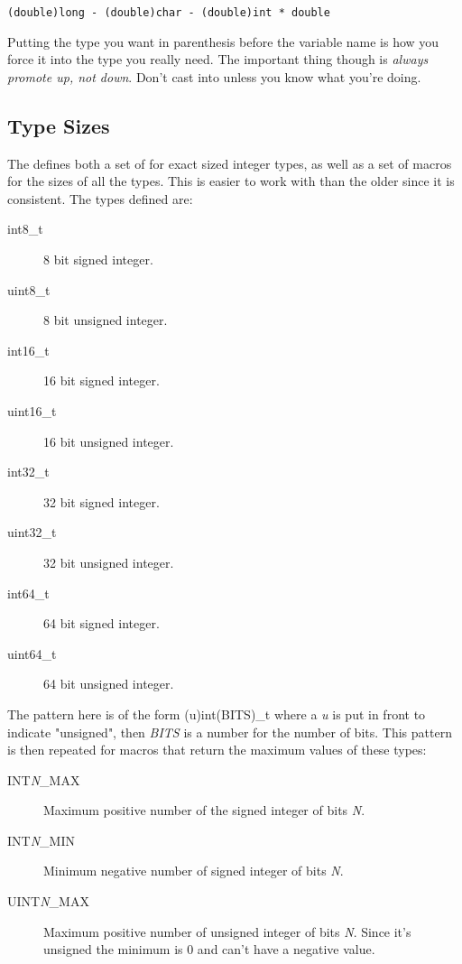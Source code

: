 \verb|(double)long - (double)char - (double)int * double|

Putting the type you want in parenthesis before the variable name is how you
force it into the type you really need.  The important thing though is 
\emph{always promote up, not down}.  Don't cast  into 
unless you know what you're doing.

\subsection{Type Sizes}

The  defines both a set of  for exact sized integer
types, as well as a set of macros for the sizes of all the types.  This is easier
to work with than the older  since it is consistent.  The types
defined are:

\begin{description}
\item[int8\_t] 8 bit signed integer.
\item[uint8\_t] 8 bit unsigned integer.
\item[int16\_t] 16 bit signed integer.
\item[uint16\_t] 16 bit unsigned integer.
\item[int32\_t] 32 bit signed integer.
\item[uint32\_t] 32 bit unsigned integer.
\item[int64\_t] 64 bit signed integer.
\item[uint64\_t] 64 bit unsigned integer.
\end{description}

The pattern here is of the form (u)int(BITS)\_t where a \emph{u} is put in front to indicate
"unsigned", then \emph{BITS} is a number for the number of bits.  This pattern is then repeated
for macros that return the maximum values of these types:

\begin{description}
\item[INT\emph{N}\_MAX] Maximum positive number of the signed integer of bits \emph{N}.
\item[INT\emph{N}\_MIN] Minimum negative number of signed integer of bits \emph{N}.
\item[UINT\emph{N}\_MAX] Maximum positive number of unsigned integer of bits \emph{N}. Since it's unsigned the minimum is 0 and can't have a negative value.
\end{description}


